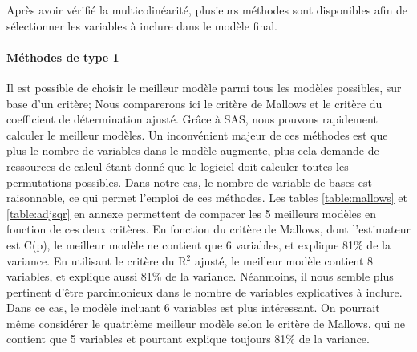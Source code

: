 \documentclass[11pt,a4paper]{article}
\begin{document}
Après avoir vérifié la multicolinéarité, plusieurs méthodes sont disponibles afin de sélectionner les variables à inclure dans le modèle final. 

\paragraph{Méthodes de type 1} Il est possible de choisir le meilleur modèle parmi tous les modèles possibles, sur base d'un critère; Nous comparerons ici le critère de Mallows et le critère du coefficient de détermination ajusté. Grâce à SAS, nous pouvons rapidement calculer le meilleur modèles. Un inconvénient majeur de ces méthodes est que plus le nombre de variables dans le modèle augmente, plus cela demande de ressources de calcul étant donné que le logiciel doit calculer toutes les permutations possibles. Dans notre cas, le nombre de variable de bases est raisonnable, ce qui permet l'emploi de ces méthodes.
Les tables \ref{table:mallows} et \ref{table:adjsqr} en annexe permettent de comparer les 5 meilleurs modèles en fonction de ces deux critères. En fonction du critère de Mallows, dont l'estimateur est C(p), le meilleur modèle ne contient que 6 variables, et explique 81\% de la variance. En utilisant le critère du R$^2$ ajusté, le meilleur modèle contient 8 variables, et explique aussi 81\% de la variance. Néanmoins, il nous semble plus pertinent d'être parcimonieux dans le nombre de variables explicatives à inclure. Dans ce cas, le modèle incluant 6 variables est plus intéressant. On pourrait même considérer le quatrième meilleur modèle selon le critère de Mallows, qui ne contient que 5 variables et pourtant explique toujours 81\% de la variance.
\end{document}
